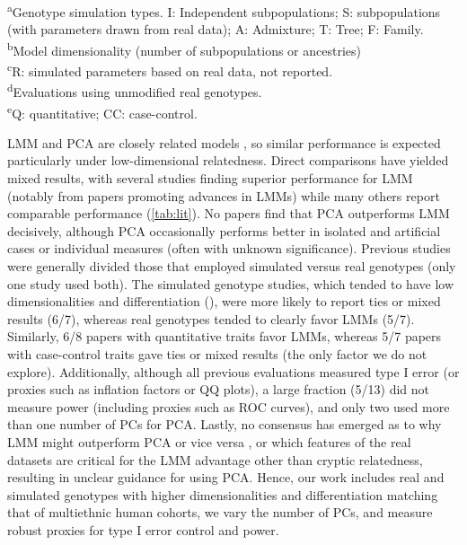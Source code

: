 \documentclass[11pt]{article}
\begin{document}
\begin{table}[b!]
\begin{tabular}{l|ccc|ccccc}
    \bottomrule
  \end{tabular}
  \begin{flushleft} 
    \textsuperscript{a}Genotype simulation types. I: Independent subpopulations; S: subpopulations (with parameters drawn from real data); A: Admixture; T: Tree; F: Family.\\
    \textsuperscript{b}Model dimensionality (number of subpopulations or ancestries)\\
    \textsuperscript{c}R: simulated parameters based on real data, \Fst not reported.\\
    \textsuperscript{d}Evaluations using unmodified real genotypes.\\
    \textsuperscript{e}Q: quantitative; CC: case-control.
  \end{flushleft}
\end{table}


LMM and PCA are closely related models \citep{astle_population_2009, hoffman_correcting_2013}, so similar performance is expected particularly under low-dimensional relatedness.
Direct comparisons have yielded mixed results, with several studies finding superior performance for LMM (notably from papers promoting advances in LMMs) while many others report comparable performance (\cref{tab:lit}).
No papers find that PCA outperforms LMM decisively, although PCA occasionally performs better in isolated and artificial cases or individual measures (often with unknown significance).
Previous studies were generally divided those that employed simulated versus real genotypes (only one study used both).
The simulated genotype studies, which tended to have low dimensionalities and differentiation (\Fst), were more likely to report ties or mixed results (6/7), whereas real genotypes tended to clearly favor LMMs (5/7).
Similarly, 6/8 papers with quantitative traits favor LMMs, whereas 5/7 papers with case-control traits gave ties or mixed results (the only factor we do not explore).
Additionally, although all previous evaluations measured type I error (or proxies such as inflation factors or QQ plots), a large fraction (5/13) did not measure power (including proxies such as ROC curves), and only two used more than one number of PCs for PCA.
Lastly, no consensus has emerged as to why LMM might outperform PCA or vice versa \citep{price_new_2010, sul_mixed_2013, price_response_2013, hoffman_correcting_2013}, or which features of the real datasets are critical for the LMM advantage other than cryptic relatedness, resulting in unclear guidance for using PCA.
Hence, our work includes real and simulated genotypes with higher dimensionalities and differentiation matching that of multiethnic human cohorts, we vary the number of PCs, and measure robust proxies for type I error control and power.
\end{document}
